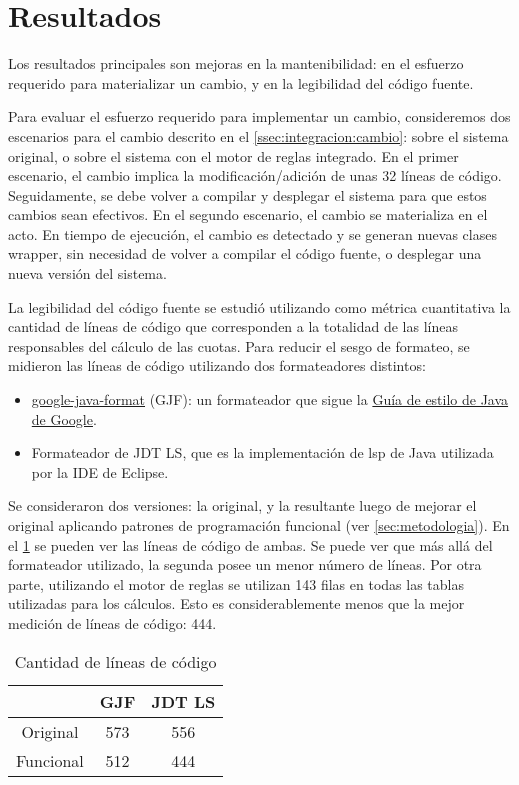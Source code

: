 \section{Resultados}
\label{sec:resultados}

Los resultados principales son mejoras en la mantenibilidad: en el esfuerzo requerido para materializar un cambio, y en la legibilidad del código fuente.

Para evaluar el esfuerzo requerido para implementar un cambio, consideremos dos escenarios para el cambio descrito en el \cref{ssec:integracion:cambio}: 
sobre el sistema original, o sobre el sistema con el motor de reglas integrado. 
En el primer escenario, el cambio implica la modificación/adición de unas 32 líneas de código.
Seguidamente, se debe volver a compilar y desplegar el sistema para que estos cambios sean efectivos.
%
En el segundo escenario, el cambio se materializa en el acto.
En tiempo de ejecución, el cambio es detectado y se generan nuevas clases wrapper, sin necesidad de volver a compilar el código fuente, o desplegar una nueva versión del sistema.


La legibilidad del código fuente se estudió utilizando como métrica cuantitativa la cantidad de líneas de código que corresponden a la totalidad de las líneas responsables del cálculo de las cuotas.
%
Para reducir el sesgo de formateo, se midieron las líneas de código utilizando dos formateadores distintos:
\begin{itemize}
    \item \href{https://github.com/google/google-java-format}{google-java-format} (GJF): un formateador que sigue la \href{https://google.github.io/styleguide/javaguide.html}{Guía de estilo de Java de Google}.
    \item Formateador de JDT LS, que es la implementación de \acrshort{lsp} de Java utilizada por la IDE de Eclipse.
\end{itemize}
Se consideraron dos versiones: la original, y la resultante luego de mejorar el original aplicando patrones de programación funcional (ver \cref{sec:metodologia}).
En el \cref{tbl:results} se pueden ver las líneas de código de ambas.
Se puede ver que más allá del formateador utilizado, la segunda posee un menor número de líneas.
%
Por otra parte, utilizando el motor de reglas se utilizan 143 filas en todas las tablas utilizadas para los cálculos. Esto es considerablemente menos que la mejor medición de líneas de código: 444.
%
\begin{table}[h]
    \centering
    \begin{tabular}{|c|c|c|}
        \hline
                  & GJF & JDT LS \\ \hline
        Original  & 573 & 556    \\ \hline
        Funcional & 512 & 444    \\ \hline
    \end{tabular}
    \caption{Cantidad de líneas de código}
    \label{tbl:results}
\end{table}


